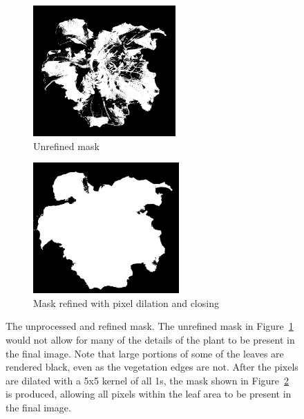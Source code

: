 \documentclass[letterpaper, notitlepage]{report}
\begin{document}
{\begin{figure}[h!]
	\centering
	\begin{subfigure}[h]{.48\textwidth}
	  \centering
	  \includegraphics[height=5cm]{./figures/mask-raw.jpg}
	  \caption{Unrefined mask}
	  \label{fig:mask-raw}
	\end{subfigure}
	\hfill
	\begin{subfigure}[h]{.48\textwidth}
	  \centering
	  \includegraphics[height=5cm]{./figures/mask-processed.jpg}
	  \caption{Mask refined with pixel dilation and closing}
	  \label{fig:mask-processed}
	\end{subfigure}
	\caption[Mask before and after morphological refinements]{The unprocessed and refined mask. The unrefined mask in Figure~\ref{fig:mask-raw} would not allow for many of the details of the plant to be present in the final image. Note that large portions of some of the leaves are rendered  black, even as the vegetation edges are not. After the pixels are dilated with a 5x5 kernel of all 1s, the mask shown in Figure~\ref{fig:mask-processed} is produced, allowing all pixels within the leaf area to be present in the final image.}
	\label{fig:mask-before-and-after}
\end{figure}

}
\end{document}
